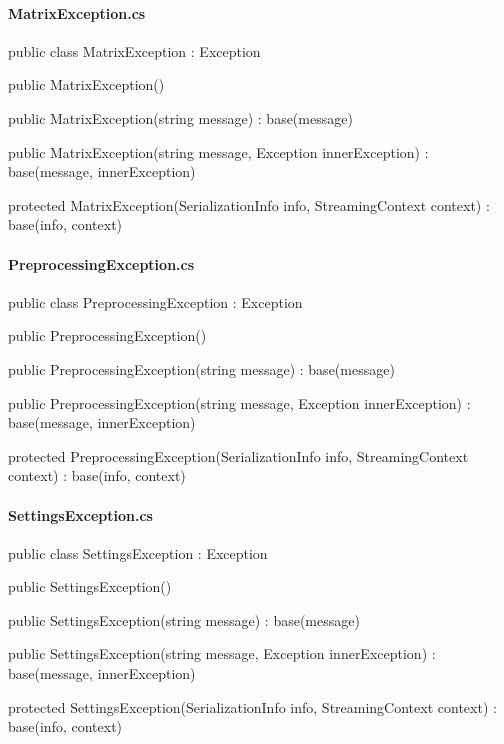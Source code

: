 \begin{flushleft}
    \paragraph{MatrixException.cs}
    \begin{cscode}
[Serializable]
public class MatrixException : Exception
{
    public MatrixException()
    {
    }

    public MatrixException(string message) : base(message)
    {
    }

    public MatrixException(string message, Exception innerException) : base(message, innerException)
    {
    }

    protected MatrixException(SerializationInfo info, StreamingContext context) : base(info, context)
    {
    }
}
    \end{cscode}
\pagebreak
    
    \paragraph{PreprocessingException.cs}
    \begin{cscode}
[Serializable]
public class PreprocessingException : Exception
{
    public PreprocessingException()
    {
    }

    public PreprocessingException(string message) : base(message)
    {
    }

    public PreprocessingException(string message, Exception innerException) : base(message, innerException)
    {
    }

    protected PreprocessingException(SerializationInfo info, StreamingContext context) : base(info, context)
    {
    }
}
    \end{cscode}
\pagebreak
    
    \paragraph{SettingsException.cs}
    \begin{cscode}
[Serializable]
public class SettingsException : Exception
{
    public SettingsException()
    {
    }

    public SettingsException(string message) : base(message)
    {
    }

    public SettingsException(string message, Exception innerException) : base(message, innerException)
    {
    }

    protected SettingsException(SerializationInfo info, StreamingContext context) : base(info, context)
    {
    }
}
    \end{cscode}
\pagebreak
    

\end{flushleft}
